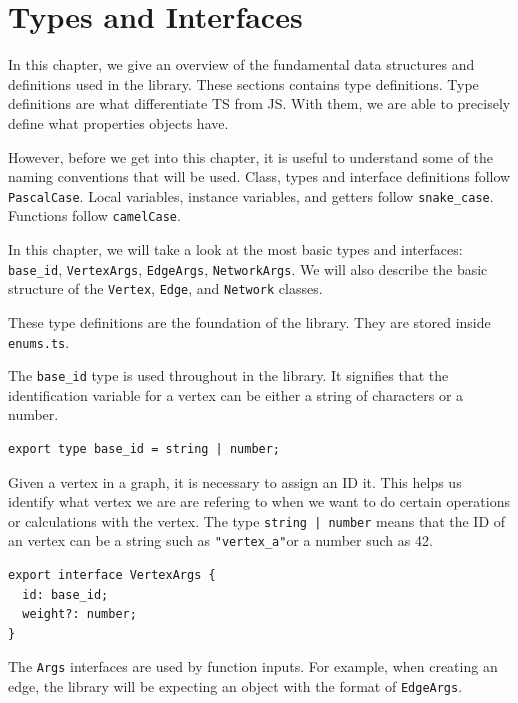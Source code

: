 \chapter{Types and Interfaces}

In this chapter, we give an overview of the fundamental 
data structures and definitions used in the library.
These sections contains type definitions.
Type definitions are what differentiate TS from JS.
With them, we are able to precisely define what properties objects have.

However, before we get into this chapter,
it is useful to understand some of the naming conventions
that will be used.
Class, types and interface definitions follow \texttt{PascalCase}.
Local variables, instance variables,
and getters follow \texttt{snake_case}.
Functions follow \texttt{camelCase}.

In this chapter, we will take a look at the most basic
types and interfaces:
\texttt{base_id}, \texttt{VertexArgs},
\texttt{EdgeArgs}, \texttt{NetworkArgs}.
We will also describe the basic structure of the \texttt{Vertex},
\texttt{Edge}, and \texttt{Network} classes.

These type definitions are the foundation of the library.
They are stored inside \texttt{enums.ts}.

The \texttt{base_id} type is used throughout in the library.
It signifies that the identification variable for a vertex can be either
a string of characters or a number.

\begin{verbatim}
export type base_id = string | number;
\end{verbatim}

Given a vertex in a graph, it is necessary to assign an ID it.
This helps us identify what vertex we are are refering to when we
want to do certain operations or calculations with the vertex.
The type \texttt{string | number} means that the ID of an vertex
can be a string such as \texttt{"vertex_a"}or a number such as 42.

\begin{verbatim}
export interface VertexArgs {
  id: base_id;
  weight?: number;
}
\end{verbatim}

The \texttt{Args} interfaces are used by function inputs.
For example, when creating an edge,
the library will be expecting an object with the format of \texttt{EdgeArgs}.

